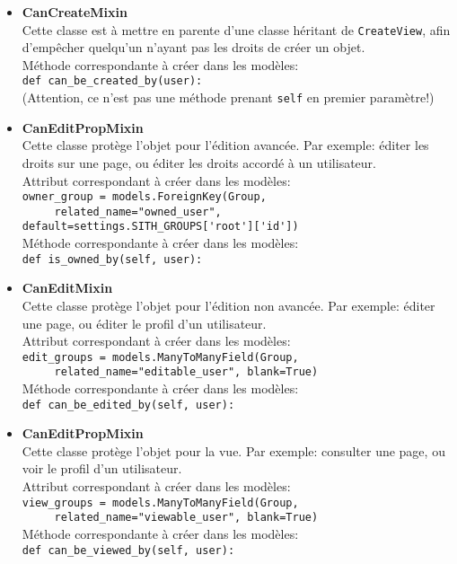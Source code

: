 \documentclass[a4paper]{report}
\begin{document}
\begin{itemize}
    \item \textbf{CanCreateMixin} \\
        Cette classe est à mettre en parente d'une classe héritant de \verb#CreateView#, afin d'empêcher quelqu'un
        n'ayant pas les droits de créer un objet.\\
        Méthode correspondante à créer dans les modèles: \\
        \verb#def can_be_created_by(user):# \\
        (Attention, ce n'est pas une méthode prenant \verb#self# en premier paramètre!)
    \item \textbf{CanEditPropMixin} \\
        Cette classe protège l'objet pour l'édition avancée. Par exemple: éditer les droits sur une page, ou éditer les
        droits accordé à un utilisateur. \\
        Attribut correspondant à créer dans les modèles: \\
        \verb#owner_group = models.ForeignKey(Group, # \\
        \verb#     related_name="owned_user", default=settings.SITH_GROUPS['root']['id'])# \\
        Méthode correspondante à créer dans les modèles: \\
        \verb#def is_owned_by(self, user):# \\
    \item \textbf{CanEditMixin} \\
        Cette classe protège l'objet pour l'édition non avancée. Par exemple: éditer une page, ou éditer le profil d'un
        utilisateur. \\
        Attribut correspondant à créer dans les modèles: \\
        \verb#edit_groups = models.ManyToManyField(Group, # \\
        \verb#     related_name="editable_user", blank=True)# \\
        Méthode correspondante à créer dans les modèles: \\
        \verb#def can_be_edited_by(self, user):# \\
    \item \textbf{CanEditPropMixin} \\
        Cette classe protège l'objet pour la vue. Par exemple: consulter une page, ou voir le profil d'un utilisateur. \\
        Attribut correspondant à créer dans les modèles: \\
        \verb#view_groups = models.ManyToManyField(Group, # \\
        \verb#     related_name="viewable_user", blank=True)# \\
        Méthode correspondante à créer dans les modèles: \\
        \verb#def can_be_viewed_by(self, user):# \\
\end{itemize}
\end{document}
